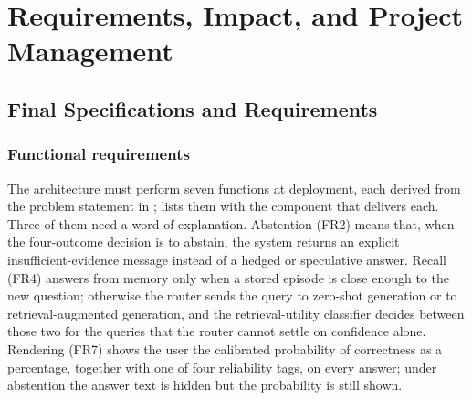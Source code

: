%

\chapter{Requirements, Impact, and Project Management}
\label{ch:requirements}


\section{Final Specifications and Requirements}
\label{sec:specifications}

\subsection{Functional requirements}
\label{sec:func-reqs}

The architecture must perform seven functions at deployment, each derived from the problem statement in ;  lists them with the component that delivers each. Three of them need a word of explanation. Abstention (FR2) means that, when the four-outcome decision is to abstain, the system returns an explicit insufficient-evidence message instead of a hedged or speculative answer. Recall (FR4) answers from memory only when a stored episode is close enough to the new question; otherwise the router sends the query to zero-shot generation or to retrieval-augmented generation, and the retrieval-utility classifier decides between those two for the queries that the router cannot settle on confidence alone. Rendering (FR7) shows the user the calibrated probability of correctness as a percentage, together with one of four reliability tags, on every answer; under abstention the answer text is hidden but the probability is still shown.

